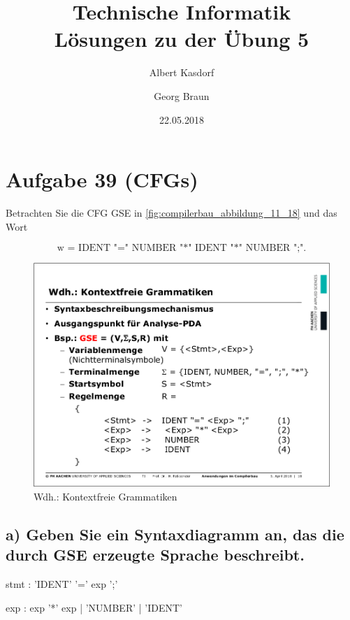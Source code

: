 \documentclass{article}
\title{Technische Informatik\\ Lösungen zu der Übung 5}
\author{
	Albert Kasdorf\and
	Georg Braun
}
\date{22.05.2018}
\begin{document}
\maketitle

\section*{Aufgabe 39 (CFGs)}
Betrachten Sie die CFG GSE in \autoref{fig:compilerbau_abbildung_11_18} und das Wort

\begin{equation*}
	\text{w = IDENT "=" NUMBER "*" IDENT "*" NUMBER ";".}
\end{equation*}

\begin{figure}[h]
	\centering
	\includegraphics[width=0.75\linewidth]{Compilerbau_Abbildung_11_18}
	\caption{Wdh.: Kontextfreie Grammatiken}
	\label{fig:compilerbau_abbildung_11_18}
\end{figure}

\subsection*{a) Geben Sie ein Syntaxdiagramm an, das die durch GSE erzeugte Sprache beschreibt.}

\begin{rail}
	stmt : 'IDENT' '=' exp ';'
\end{rail}

\begin{rail}
	exp : exp '*' exp | 'NUMBER' | 'IDENT'
\end{rail}
\end{document}
